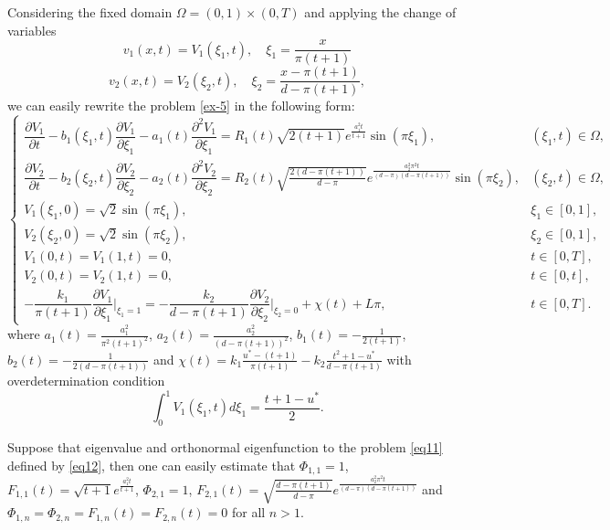 \documentclass[preprint,12pt,authoryear]{elsarticle}
\begin{document}
Considering the fixed domain $\Omega=(0,1)\times (0,T)$ and applying the change of variables 
$$v_1(x,t)=V_1(\xi_1,t),\quad \xi_1=\frac{x}{\pi(t+1)}$$
$$v_2(x,t)=V_2(\xi_2,t),\quad \xi_2=\frac{x-\pi(t+1)}{d-\pi(t+1)},$$
we can easily rewrite the problem \eqref{ex-5} in the following form:
\begin{equation}\label{ex-6}
    \begin{cases}
        \dfrac{\partial V_1}{\partial t}-b_1(\xi_1,t)\dfrac{\partial V_1}{\partial \xi_1}-a_1(t)\dfrac{\partial^2 V_1}{\partial \xi_1}=R_1(t)\sqrt{2(t+1)}e^{\frac{a_1^2t}{t+1}}\sin(\pi\xi_1),&(\xi_1,t)\in\Omega,\\
        \dfrac{\partial V_2}{\partial t}-b_2(\xi_2,t)\dfrac{\partial V_2}{\partial \xi_2}-a_2(t)\dfrac{\partial^2 V_2}{\partial \xi_2}=R_2(t)\sqrt{\frac{2(d-\pi(t+1))}{d-\pi}}e^{\frac{a_2^2\pi^2 t}{(d-\pi)(d-\pi(t+1))}}\sin(\pi\xi_2),&(\xi_2,t)\in\Omega,\\
        V_1(\xi_1,0)=\sqrt{2}\sin(\pi\xi_1),&\xi_1\in[0,1],\\
        V_2(\xi_2,0)=\sqrt{2}\sin(\pi\xi_2),&\xi_2\in[0,1],\\
        V_1(0,t)=V_1(1,t)=0,&t\in[0,T],\\
        V_2(0,t)=V_2(1,t)=0,&t\in[0,t],\\
        -\dfrac{k_1}{\pi(t+1)}\dfrac{\partial V_1}{\partial \xi_1}\bigg|_{\xi_1=1}=-\dfrac{k_2}{d-\pi(t+1)}\dfrac{\partial V_2}{\partial \xi_2}\bigg|_{\xi_2=0}+\chi(t)+L\pi,&t\in[0,T].
    \end{cases}
\end{equation}
where $a_1(t)=\frac{a_1^2}{\pi^2(t+1)^2}$, $a_2(t)=\frac{a_2^2}{(d-\pi(t+1))^2}$, $b_1(t)=-\frac{1}{2(t+1)}$, $b_2(t)=-\frac{1}{2(d-\pi(t+1))}$ and $\chi(t)=k_1\frac{u^*-(t+1)}{\pi(t+1)}-k_2\frac{t^2+1-u^*}{d-\pi(t+1)}$ with overdetermination condition
$$\int_0^1V_1(\xi_1,t)d\xi_1=\dfrac{t+1-u^*}{2}.$$

Suppose that eigenvalue and orthonormal eigenfunction to the problem \eqref{eq11} defined by \eqref{eq12}, then one can easily estimate that $\Phi_{1,1}=1$, $F_{1,1}(t)=\sqrt{t+1}e^{\frac{a_1^2t}{t+1}}$, $\Phi_{2,1}=1$, $F_{2,1}(t)=\sqrt{\frac{d-\pi(t+1)}{d-\pi}}e^{\frac{a_2^2\pi^2t}{(d-\pi)(d-\pi(t+1))}}$ and $\Phi_{1,n}=\Phi_{2,n}=F_{1,n}(t)=F_{2,n}(t)=0$ for all $n>1$.
\end{document}
